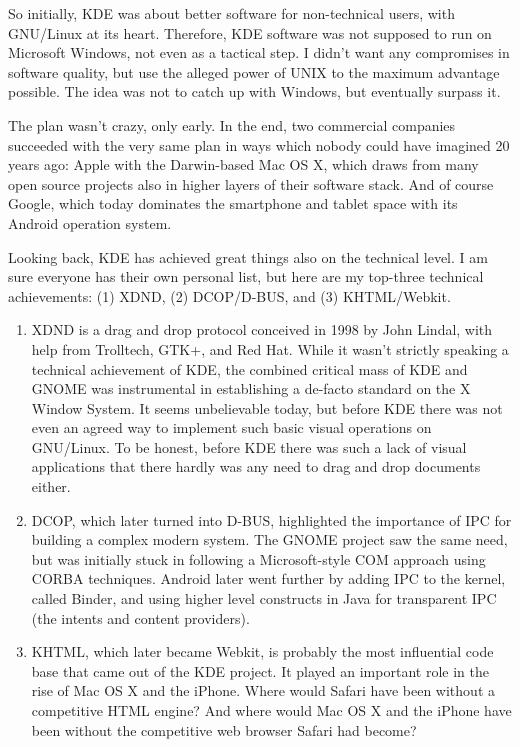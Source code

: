 So initially, KDE was about better software for non-technical users, with GNU/Linux at its heart.  Therefore, KDE software was not supposed to run on Microsoft Windows, not even as a tactical step. I didn't want any compromises in software quality, but use the alleged power of UNIX to the maximum advantage possible. The idea was not to catch up with Windows, but eventually surpass it.
 
The plan wasn't crazy, only early. In the end, two commercial companies succeeded with the very same plan in ways which nobody could have imagined 20 years ago: Apple with the Darwin-based Mac OS X, which draws from many open source projects also in higher layers of their software stack. And of course Google, which today dominates the smartphone and tablet space with its Android operation system.
 
Looking back, KDE has achieved great things also on the technical level. I am sure everyone has their own personal list, but here are my top-three technical achievements:  (1) XDND, (2) DCOP/D-BUS, and (3) KHTML/Webkit.
 
\begin{enumerate}
 \item XDND is a drag and drop protocol conceived in 1998 by John Lindal, with help from Trolltech, GTK+, and Red Hat. While it wasn't strictly speaking a technical achievement of KDE, the combined critical mass of KDE and GNOME was instrumental in establishing a de-facto standard on the X Window System. It seems unbelievable today, but before KDE there was not even an agreed way to implement such basic visual operations on GNU/Linux. To be honest, before KDE there was such a lack of visual applications that there hardly was any need to drag and drop documents either.
 \item DCOP, which later turned into D-BUS, highlighted the importance of IPC for building a complex modern system. The GNOME project saw the same need, but was initially stuck in following a Microsoft-style COM approach using CORBA techniques. Android later went further by adding IPC to the kernel, called Binder, and using higher level constructs in Java for transparent IPC (the intents and content providers).
 \item KHTML, which later became Webkit, is probably the most influential code base that came out of the KDE project. It played an important role in the rise of Mac OS X and the iPhone. Where would Safari have been without a competitive HTML engine? And where would Mac OS X and the iPhone have been without the competitive web browser Safari had become?
\end{enumerate}

